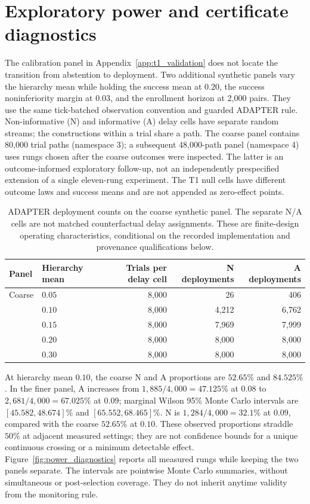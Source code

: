 \clearpage
\section{Exploratory power and certificate diagnostics}
\label{app:power_diagnostics}
The calibration panel in Appendix~\ref{app:t1_validation} does not locate the
transition from abstention to deployment. Two additional synthetic panels vary
the hierarchy mean while holding the success mean at $0.20$, the success
noninferiority margin at $0.03$, and the enrollment horizon at 2,000 pairs.
They use the same tick-batched observation convention and guarded ADAPTER rule.
Non-informative (N) and informative (A) delay cells have separate random streams;
the constructions within a trial share a path. The coarse panel contains
80,000 trial paths (namespace 3); a subsequent 48,000-path panel (namespace 4)
uses rungs chosen after the coarse outcomes were inspected. The latter is an
outcome-informed exploratory follow-up, not an independently prespecified
extension of a single eleven-rung experiment. The T1 null cells have different
outcome laws and success means and are not appended as zero-effect points.

\begin{table}[ht]
\centering\small
\begin{tabular}{llrrr}
\toprule
Panel & Hierarchy mean & Trials per delay cell & N deployments & A deployments\\
\midrule
Coarse & $0.05$ & 8,000 & 26 & 406\\
& $0.10$ & 8,000 & 4,212 & 6,762\\
& $0.15$ & 8,000 & 7,969 & 7,999\\
& $0.20$ & 8,000 & 8,000 & 8,000\\
& $0.30$ & 8,000 & 8,000 & 8,000\\
\bottomrule
\end{tabular}
\caption{ADAPTER deployment counts on the coarse synthetic panel. The separate
N/A cells are not matched counterfactual delay assignments. These are finite-design
operating characteristics, conditional on the recorded implementation and
provenance qualifications below.}
\label{tab:power_coarse}
\end{table}

At hierarchy mean $0.10$, the coarse N and A proportions are $52.65\%$ and
$84.525\%$. In the finer panel, A increases from $1,885/4,000=47.125\%$ at
$0.08$ to $2,681/4,000=67.025\%$ at $0.09$; marginal Wilson 95\% Monte Carlo
intervals are $[45.582,48.674]\%$ and $[65.552,68.465]\%$.
N is $1,284/4,000=32.1\%$ at $0.09$, compared with the coarse $52.65\%$
at $0.10$. These observed proportions straddle $50\%$ at adjacent measured
settings; they are not confidence bounds for a unique continuous crossing or a
minimum detectable effect. Figure~\ref{fig:power_diagnostics} reports all measured
rungs while keeping the two panels separate. The intervals are pointwise Monte
Carlo summaries, without simultaneous or post-selection coverage. They do not
inherit anytime validity from the monitoring rule.

